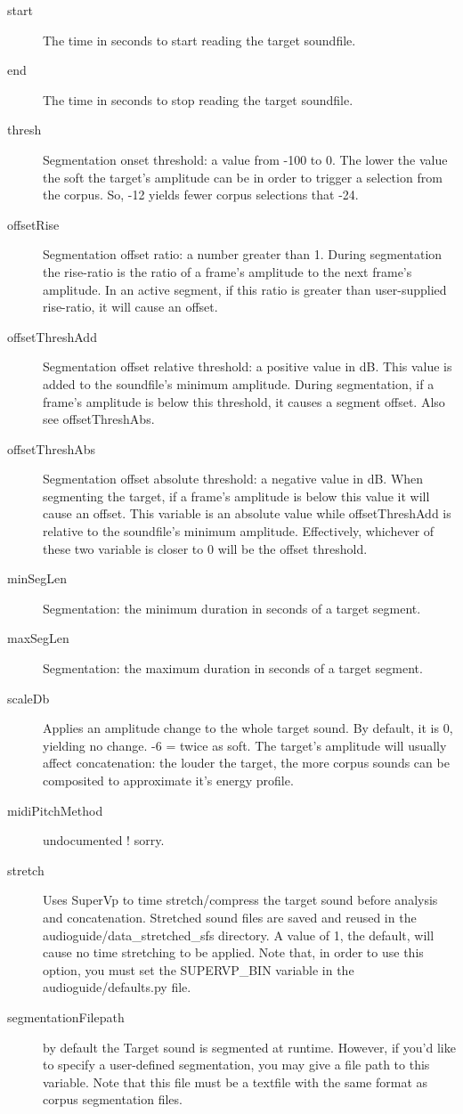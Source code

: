 \documentclass{article}
\begin{document}
\begin{spacing}{1.2}
\begin{description}
\item[start] The time in seconds to start reading the target soundfile.
\item[end] The time in seconds to stop reading the target soundfile.  
\item[thresh] Segmentation onset threshold: a value from -100 to 0.  The lower the value the soft the target's amplitude can be in order to trigger a selection from the corpus.  So, -12 yields fewer corpus selections that -24.  
\item[offsetRise] Segmentation offset ratio: a number greater than 1.   During segmentation the rise-ratio is the ratio of a frame's amplitude to the next frame's amplitude.   In an active segment, if this ratio is greater than user-supplied rise-ratio, it will cause an offset.
\item[offsetThreshAdd] Segmentation offset relative threshold: a positive value in dB.  
This value is added to the soundfile's minimum amplitude.  During segmentation, if a frame's amplitude is below this threshold, it causes a segment offset.  Also see offsetThreshAbs.
\item[offsetThreshAbs] Segmentation offset absolute threshold: a negative value in dB.  When segmenting the target, if a frame's amplitude is below this value it will cause an offset.  This variable is an absolute value while offsetThreshAdd is relative to the soundfile's minimum amplitude.  Effectively, whichever of these two variable is closer to 0 will be the offset threshold.
\item[minSegLen] Segmentation: the minimum duration in seconds of a target segment.
\item[maxSegLen] Segmentation: the maximum duration in seconds of a target segment.

\item[scaleDb] Applies an amplitude change to the whole target sound. By default, it is 0, yielding no change. -6 = twice as soft.  The target's amplitude will usually affect concatenation: the louder the target, the more corpus sounds can be composited to approximate it's energy profile.

\item[midiPitchMethod] undocumented !  sorry.
\item[stretch] Uses SuperVp to time stretch/compress the target sound before analysis and concatenation.  Stretched sound files are saved and reused in the audioguide/data\_stretched\_sfs directory.  A value of 1, the default, will cause no time stretching to be applied.  Note that, in order to use this option, you must set the SUPERVP\_BIN variable in the audioguide/defaults.py file.
\item[segmentationFilepath] by default the Target sound is segmented at runtime.  However, if you'd like to specify a user-defined segmentation, you may give a file path to this variable.  Note that this file must be a textfile with the same format as corpus segmentation files.
\end{description}



\end{spacing}
\end{document}
